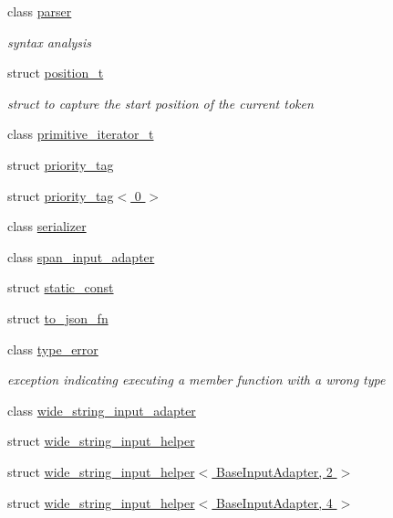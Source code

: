 \begin{DoxyCompactItemize}
class \hyperlink{classnlohmann_1_1detail_1_1parser}{parser}
\begin{DoxyCompactList}\small\item\em syntax analysis \end{DoxyCompactList}\item 
struct \hyperlink{structnlohmann_1_1detail_1_1position__t}{position\+\_\+t}
\begin{DoxyCompactList}\small\item\em struct to capture the start position of the current token \end{DoxyCompactList}\item 
class \hyperlink{classnlohmann_1_1detail_1_1primitive__iterator__t}{primitive\+\_\+iterator\+\_\+t}
\item 
struct \hyperlink{structnlohmann_1_1detail_1_1priority__tag}{priority\+\_\+tag}
\item 
struct \hyperlink{structnlohmann_1_1detail_1_1priority__tag_3_010_01_4}{priority\+\_\+tag$<$ 0 $>$}
\item 
class \hyperlink{classnlohmann_1_1detail_1_1serializer}{serializer}
\item 
class \hyperlink{classnlohmann_1_1detail_1_1span__input__adapter}{span\+\_\+input\+\_\+adapter}
\item 
struct \hyperlink{structnlohmann_1_1detail_1_1static__const}{static\+\_\+const}
\item 
struct \hyperlink{structnlohmann_1_1detail_1_1to__json__fn}{to\+\_\+json\+\_\+fn}
\item 
class \hyperlink{classnlohmann_1_1detail_1_1type__error}{type\+\_\+error}
\begin{DoxyCompactList}\small\item\em exception indicating executing a member function with a wrong type \end{DoxyCompactList}\item 
class \hyperlink{classnlohmann_1_1detail_1_1wide__string__input__adapter}{wide\+\_\+string\+\_\+input\+\_\+adapter}
\item 
struct \hyperlink{structnlohmann_1_1detail_1_1wide__string__input__helper}{wide\+\_\+string\+\_\+input\+\_\+helper}
\item 
struct \hyperlink{structnlohmann_1_1detail_1_1wide__string__input__helper_3_01BaseInputAdapter_00_012_01_4}{wide\+\_\+string\+\_\+input\+\_\+helper$<$ Base\+Input\+Adapter, 2 $>$}
\item 
struct \hyperlink{structnlohmann_1_1detail_1_1wide__string__input__helper_3_01BaseInputAdapter_00_014_01_4}{wide\+\_\+string\+\_\+input\+\_\+helper$<$ Base\+Input\+Adapter, 4 $>$}
\end{DoxyCompactItemize}
